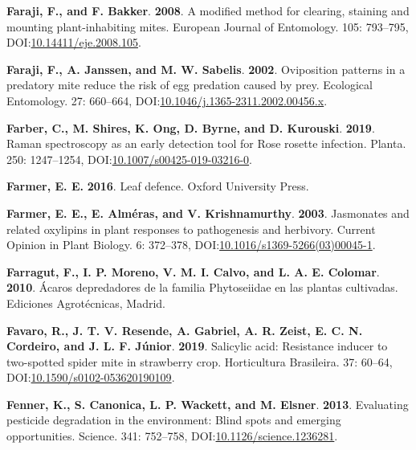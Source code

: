 \documentclass[12pt,final,CPage]{ufthesis}
\newlength{\cslhangindent}
\newenvironment{CSLReferences}[2] %
{%
	\setlength{\parindent}{0pt}
	\ifodd #1 \everypar{\setlength{\hangindent}{\cslhangindent}}\ignorespaces\fi
	\ifnum #2 > 0
	\setlength{\parskip}{#2\baselineskip}
	\fi
}%
{}
\begin{document}
{\begin{CSLReferences}{1}{0}
  \leavevmode{}%
  \textbf{Faraji, F., and F. Bakker}. \textbf{2008}. A modified method for clearing, staining and mounting plant-inhabiting mites. European Journal of Entomology. 105: 793--795, DOI:\href{https://doi.org/10.14411/eje.2008.105}{10.14411/eje.2008.105}.

  \leavevmode{}%
  \textbf{Faraji, F., A. Janssen, and M. W. Sabelis}. \textbf{2002}. Oviposition patterns in a predatory mite reduce the risk of egg predation caused by prey. Ecological Entomology. 27: 660--664, DOI:\href{https://doi.org/10.1046/j.1365-2311.2002.00456.x}{10.1046/j.1365-2311.2002.00456.x}.

  \leavevmode{}%
  \textbf{Farber, C., M. Shires, K. Ong, D. Byrne, and D. Kurouski}. \textbf{2019}. {Raman} spectroscopy as an early detection tool for {Rose rosette} infection. Planta. 250: 1247--1254, DOI:\href{https://doi.org/10.1007/s00425-019-03216-0}{10.1007/s00425-019-03216-0}.

  \leavevmode{}%
  \textbf{Farmer, E. E.} \textbf{2016}. Leaf defence. Oxford University Press.

  \leavevmode{}%
  \textbf{Farmer, E. E., E. Alméras, and V. Krishnamurthy}. \textbf{2003}. Jasmonates and related oxylipins in plant responses to pathogenesis and herbivory. Current Opinion in Plant Biology. 6: 372--378, DOI:\href{https://doi.org/10.1016/s1369-5266(03)00045-1}{10.1016/s1369-5266(03)00045-1}.

  \leavevmode{}%
  \textbf{Farragut, F., I. P. Moreno, V. M. I. Calvo, and L. A. E. Colomar}. \textbf{2010}. {Á}caros depredadores de la familia {Phytoseiidae} en las plantas cultivadas. Ediciones Agrot{é}cnicas, Madrid.

  \leavevmode{}%
  \textbf{Favaro, R., J. T. V. Resende, A. Gabriel, A. R. Zeist, E. C. N. Cordeiro, and J. L. F. Júnior}. \textbf{2019}. Salicylic acid: Resistance inducer to two-spotted spider mite in strawberry crop. Horticultura Brasileira. 37: 60--64, DOI:\href{https://doi.org/10.1590/s0102-053620190109}{10.1590/s0102-053620190109}.

  \leavevmode{}%
  \textbf{Fenner, K., S. Canonica, L. P. Wackett, and M. Elsner}. \textbf{2013}. Evaluating pesticide degradation in the environment: Blind spots and emerging opportunities. Science. 341: 752--758, DOI:\href{https://doi.org/10.1126/science.1236281}{10.1126/science.1236281}.


\end{CSLReferences}}
\end{document}
